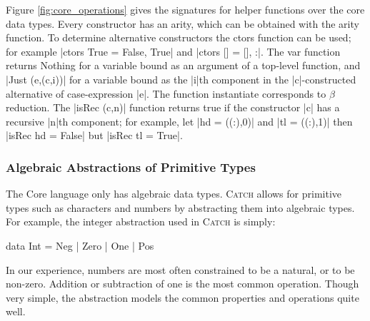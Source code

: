 \documentclass[preprint]{sigplanconf}
\newcommand{\C}[1]{\textsf{#1}}
\newcommand{\catch}{\textsc{Catch}}
\begin{document}
Figure \ref{fig:core_operations} gives the signatures for helper functions over the core data types. Every constructor has an arity, which can be obtained with the \C{arity} function. To determine alternative constructors the \C{ctors} function can be used; for example |ctors True = {False, True}| and |ctors [] = {[], :}|. The \C{var} function returns \C{Nothing} for a variable bound as an argument of a top-level function, and |Just (e,(c,i))| for a variable bound as the |i|th component in the |c|-constructed alternative of case-expression |e|. The function \C{instantiate} corresponds to $\beta$ reduction. The |isRec (c,n)| function returns true if the constructor |c| has a recursive |n|th component; for example, let |hd = ((:),0)| and |tl = ((:),1)| then |isRec hd = False| but |isRec tl = True|.

\subsubsection{Algebraic Abstractions of Primitive Types}
\label{sec:abstraction}

\begin{comment}
Natural numbers are often encoded by Peano numerals, and this idea can easily be extended to integers:

\begin{code}
data Pos  = One | Succ Pos
data Int  = Minus Pos | Zero | Plus Pos
\end{code}

Although this abstraction of \C{Int} captures all the underlying detail of the number system, the underlying constraint systems discussed in \S\ref{sec:constraint} would be unable to distinguishing between any pair of numbers both greater than 2, or both less than -2.
\end{comment}

The Core language only has algebraic data types. \catch{} allows for primitive types such as characters and numbers by abstracting them into algebraic types. For example, the integer abstraction used in \catch{} is simply:

\begin{code}
data Int = Neg | Zero | One | Pos
\end{code}

In our experience, numbers are most often constrained to be a natural, or to be non-zero. Addition or subtraction of one is the most common operation. Though very simple, the abstraction models the common properties and operations quite well.
\end{document}
